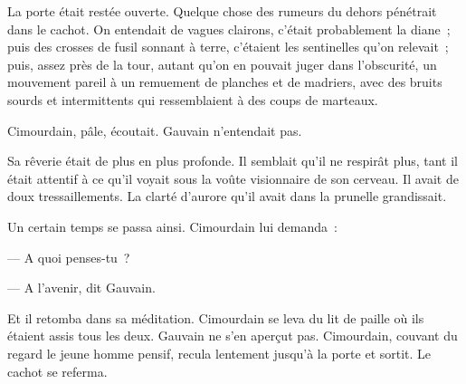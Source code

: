 \documentclass[french,twoside]{book} %
\begin{document}
La porte était restée ouverte. Quelque chose des rumeurs du dehors pénétrait dans le cachot. On  entendait de vagues clairons, c’était probablement la diane ; puis des crosses de fusil sonnant à terre, c’étaient les sentinelles qu’on relevait ; puis, assez près de la tour, autant qu’on en pouvait juger dans l’obscurité, un mouvement pareil à un remuement de planches et de madriers, avec des bruits sourds et intermittents qui ressemblaient à des coups de marteaux.\par
Cimourdain, pâle, écoutait. Gauvain n’entendait pas.\par
Sa rêverie était de plus en plus profonde. Il semblait qu’il ne respirât plus, tant il était attentif à ce qu’il voyait sous la voûte visionnaire de son cerveau. Il avait de doux tressaillements. La clarté d’aurore qu’il avait dans la prunelle grandissait.\par
Un certain temps se passa ainsi. Cimourdain lui demanda :\par
— A quoi penses-tu ?\par
— A l’avenir, dit Gauvain.\par
Et il retomba dans sa méditation. Cimourdain se leva du lit de paille où ils étaient assis tous les deux. Gauvain ne s’en aperçut pas. Cimourdain, couvant du regard le jeune homme pensif, recula lentement jusqu’à la porte et sortit. Le cachot se referma.
\end{document}
